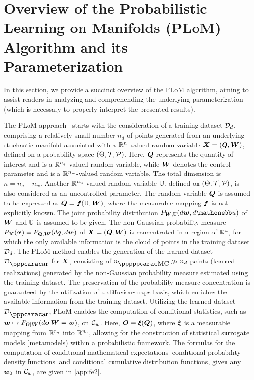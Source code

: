 \section{Overview of the Probabilistic Learning on Manifolds (PLoM) Algorithm and its Parameterization}
\label{sec:PLoM}
In this section, we provide a succinct overview of the PLoM algorithm, aiming to assist readers in analyzing and comprehending the underlying parameterization (which is necessary to properly interpret the presented results).

The PLoM approach~\cite{Soize2016,Soize2020c,Soize2022a} starts with the consideration of a training dataset ${\mathcal{D}}_d$, comprising a relatively small number $n_d$ of points generated from an underlying stochastic manifold associated with a ${\mathbb{R}}^{n}$-valued random variable ${\boldsymbol{X}} = ({\boldsymbol{Q}},{\boldsymbol{W}})$, defined on a probability space $(\Theta,{\mathcal{T}},{\mathcal{P}})$. Here, ${\boldsymbol{Q}}$ represents the quantity of interest and is a ${\mathbb{R}}^{n_q}$-valued random variable, while ${\boldsymbol{W}}$ denotes the control parameter and is a ${\mathbb{R}}^{n_w}$-valued random variable. The total dimension is $n=n_q+n_w$.
%
Another ${\mathbb{R}}^{n_u}$-valued random variable ${\mathbb{U}}$, defined on $(\Theta,{\mathcal{T}},{\mathcal{P}})$, is also considered as an uncontrolled parameter. The random variable ${\boldsymbol{Q}}$ is assumed to be expressed as ${\boldsymbol{Q}} = {\boldsymbol{f}}({\mathbb{U}},{\boldsymbol{W}})$, where the measurable mapping ${\boldsymbol{f}}$ is not explicitly known. The joint probability distribution $P_{\bfW,\UU}(d\bfw,d\uu)$ of  ${\boldsymbol{W}}$ and ${\mathbb{U}}$ is assumed to be given. The non-Gaussian probability measure $P_{{\boldsymbol{X}}}({\boldsymbol{x}}) = P_{{\boldsymbol{Q}},{\boldsymbol{W}}}(d{\boldsymbol{q}},d{\boldsymbol{w}})$ of ${\boldsymbol{X}} =({\boldsymbol{Q}},{\boldsymbol{W}})$ is concentrated in a region of ${\mathbb{R}}^{n}$, for which the only available information is the cloud of points in the training dataset ${\mathcal{D}}_d$. The PLoM method enables the generation of  the learned dataset $\curD_{\ar}$ for ${\boldsymbol{X}}$, consisting of $n_{\pMC} \gg n_d$ points (learned realizations) generated by the non-Gaussian probability measure estimated using the training dataset.
%
The preservation of the probability measure concentration is guaranteed by the utilization of a diffusion-maps basis, which enriches the available information from the training dataset. Utilizing the learned dataset $\curD_\ar$, PLoM enables the computation of conditional statistics, such as ${\boldsymbol{w}}\mapsto P_{{\boldsymbol{O}}\vert {\boldsymbol{W}}}(d{\boldsymbol{o}}\vert{\boldsymbol{W}}={\boldsymbol{w}})$, on ${\mathcal{C}}_w$. Here, ${\boldsymbol{O}} = {\boldsymbol{\xi}}({\boldsymbol{Q}})$, where ${\boldsymbol{\xi}}$ is a measurable mapping from ${\mathbb{R}}^{n_q}$ into ${\mathbb{R}}^{n_o}$, allowing for the construction of statistical surrogate models (metamodels) within a probabilistic framework. The formulas for the computation of conditional mathematical expectations, conditional probability density functions, and conditional cumulative distribution functions, given any ${\boldsymbol{w}}_0$ in ${\mathcal{C}}_w$, are given in \ref{app:fe2}.

